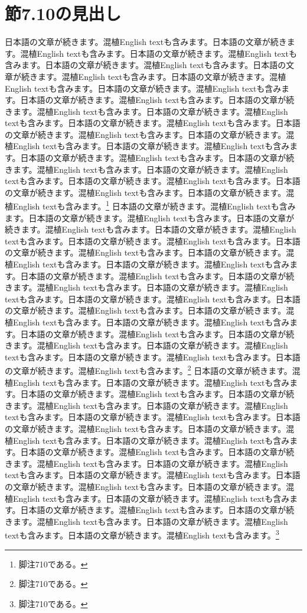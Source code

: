 \documentclass[pdflatex,book]{jlreq}
\begin{document}
\section{節7.10の見出し}
日本語の文章が続きます。混植English textも含みます。日本語の文章が続きます。混植English textも含みます。日本語の文章が続きます。混植English textも含みます。日本語の文章が続きます。混植English textも含みます。日本語の文章が続きます。混植English textも含みます。日本語の文章が続きます。混植English textも含みます。日本語の文章が続きます。混植English textも含みます。日本語の文章が続きます。混植English textも含みます。日本語の文章が続きます。混植English textも含みます。日本語の文章が続きます。混植English textも含みます。日本語の文章が続きます。混植English textも含みます。日本語の文章が続きます。混植English textも含みます。日本語の文章が続きます。混植English textも含みます。日本語の文章が続きます。混植English textも含みます。日本語の文章が続きます。混植English textも含みます。日本語の文章が続きます。混植English textも含みます。日本語の文章が続きます。混植English textも含みます。日本語の文章が続きます。混植English textも含みます。日本語の文章が続きます。混植English textも含みます。日本語の文章が続きます。混植English textも含みます。\footnote{脚注710である。}
日本語の文章が続きます。混植English textも含みます。日本語の文章が続きます。混植English textも含みます。日本語の文章が続きます。混植English textも含みます。日本語の文章が続きます。混植English textも含みます。日本語の文章が続きます。混植English textも含みます。日本語の文章が続きます。混植English textも含みます。日本語の文章が続きます。混植English textも含みます。日本語の文章が続きます。混植English textも含みます。日本語の文章が続きます。混植English textも含みます。日本語の文章が続きます。混植English textも含みます。日本語の文章が続きます。混植English textも含みます。日本語の文章が続きます。混植English textも含みます。日本語の文章が続きます。混植English textも含みます。日本語の文章が続きます。混植English textも含みます。日本語の文章が続きます。混植English textも含みます。日本語の文章が続きます。混植English textも含みます。日本語の文章が続きます。混植English textも含みます。日本語の文章が続きます。混植English textも含みます。日本語の文章が続きます。混植English textも含みます。日本語の文章が続きます。混植English textも含みます。\footnote{脚注710である。}
日本語の文章が続きます。混植English textも含みます。日本語の文章が続きます。混植English textも含みます。日本語の文章が続きます。混植English textも含みます。日本語の文章が続きます。混植English textも含みます。日本語の文章が続きます。混植English textも含みます。日本語の文章が続きます。混植English textも含みます。日本語の文章が続きます。混植English textも含みます。日本語の文章が続きます。混植English textも含みます。日本語の文章が続きます。混植English textも含みます。日本語の文章が続きます。混植English textも含みます。日本語の文章が続きます。混植English textも含みます。日本語の文章が続きます。混植English textも含みます。日本語の文章が続きます。混植English textも含みます。日本語の文章が続きます。混植English textも含みます。日本語の文章が続きます。混植English textも含みます。日本語の文章が続きます。混植English textも含みます。日本語の文章が続きます。混植English textも含みます。日本語の文章が続きます。混植English textも含みます。日本語の文章が続きます。混植English textも含みます。日本語の文章が続きます。混植English textも含みます。\footnote{脚注710である。}
\end{document}
